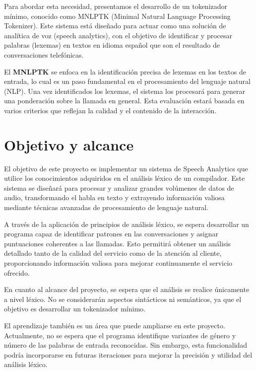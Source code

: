 \documentclass[twocolumn, fontsize=10pt]{article}
\begin{document}
Para abordar esta necesidad, presentamos el desarrollo de un tokenizador mínimo, conocido como MNLPTK (Minimal Natural Language Processing Tokenizer). Este sistema está diseñado para actuar como una solución de analítica de voz (speech analytics), con el objetivo de identificar y procesar palabras (lexemas) en textos en idioma español que son el resultado de conversaciones telefónicas.

El \textbf{MNLPTK} se enfoca en la identificación precisa de lexemas en los textos de entrada, lo cual es un paso fundamental en el procesamiento del lenguaje natural (NLP). Una vez identificados los lexemas, el sistema los procesará para generar una ponderación sobre la llamada en general. Esta evaluación estará basada en varios criterios que reflejan la calidad y el contenido de la interacción.

\section{Objetivo y alcance}
El objetivo de este proyecto es implementar un sistema de Speech Analytics que utilice los conocimientos adquiridos en el análisis léxico de un compilador. Este sistema se diseñará para procesar y analizar grandes volúmenes de datos de audio, transformando el habla en texto y extrayendo información valiosa mediante técnicas avanzadas de procesamiento de lenguaje natural.

A través de la aplicación de principios de análisis léxico, se espera desarrollar un programa capaz de identificar patrones en las conversaciones y asignar puntuaciones coherentes a las llamadas. Esto permitirá obtener un análisis detallado tanto de la calidad del servicio como de la atención al cliente, proporcionando información valiosa para mejorar continuamente el servicio ofrecido.

En cuanto al alcance del proyecto, se espera que el análisis se realice únicamente a nivel léxico. No se considerarán aspectos sintácticos ni semánticos, ya que el objetivo es desarrollar un tokenizador mínimo.

El aprendizaje también es un área que puede ampliarse en este proyecto. Actualmente, no se espera que el programa identifique variantes de género y número de las palabras de entrada reconocidas. Sin embargo, esta funcionalidad podría incorporarse en futuras iteraciones para mejorar la precisión y utilidad del análisis léxico.

\end{document}
